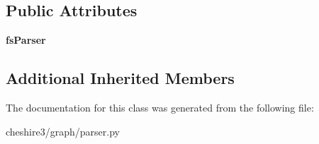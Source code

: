 \subsection*{Public Attributes}
\begin{DoxyCompactItemize}
\item 
\hypertarget{classcheshire3_1_1graph_1_1parser_1_1_ore_rdf_graph_parser_a2f10a148a4ea470fe3979019f60c2d16}{{\bfseries fs\-Parser}}\label{classcheshire3_1_1graph_1_1parser_1_1_ore_rdf_graph_parser_a2f10a148a4ea470fe3979019f60c2d16}

\end{DoxyCompactItemize}
\subsection*{Additional Inherited Members}


The documentation for this class was generated from the following file\-:\begin{DoxyCompactItemize}
\item 
cheshire3/graph/parser.\-py\end{DoxyCompactItemize}
